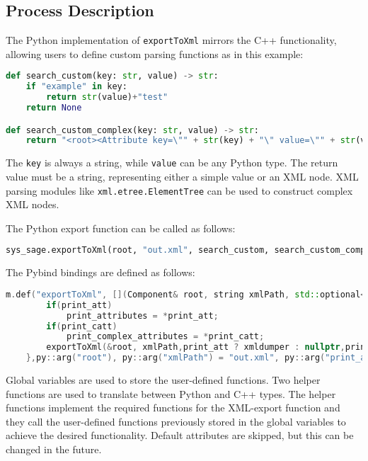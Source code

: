 \subsection{Process Description}

The Python implementation of \verb|exportToXml| mirrors the C++ functionality, allowing users to define custom parsing functions as in this example:

\begin{lstlisting}[language=Python, xleftmargin=4em, frame = single]
def search_custom(key: str, value) -> str:
    if "example" in key:
        return str(value)+"test"
    return None

def search_custom_complex(key: str, value) -> str:
    return "<root><Attribute key=\"" + str(key) + "\" value=\"" + str(value) + "\"/><root>"
\end{lstlisting}

The \verb|key| is always a string, while \verb|value| can be any Python type. The return value must be a string, representing either a simple value or an XML node. XML parsing modules like \verb|xml.etree.ElementTree| can be used to construct complex XML nodes.

The Python export function can be called as follows:

\begin{lstlisting}[language=Python, xleftmargin=4em, frame = single]
sys_sage.exportToXml(root, "out.xml", search_custom, search_custom_complex)
\end{lstlisting}

The Pybind bindings are defined as follows:

\begin{lstlisting}[language=C++, xleftmargin=4em, frame = single]
m.def("exportToXml", [](Component& root, string xmlPath, std::optional<py::function> print_att = std::nullopt, std::optional<py::function> print_catt = std::nullopt) {
        if(print_att)
            print_attributes = *print_att;
        if(print_catt)
            print_complex_attributes = *print_catt;
        exportToXml(&root, xmlPath,print_att ? xmldumper : nullptr,print_catt ? xmldumper_complex : nullptr);
    },py::arg("root"), py::arg("xmlPath") = "out.xml", py::arg("print_att") = py::none(), py::arg("print_catt") = py::none());
\end{lstlisting}

Global variables are used to store the user-defined functions. Two helper functions are used to translate between Python and C++ types. The helper functions implement the required functions for the XML-export function and they call the user-defined functions previously stored in the global variables to achieve the desired functionality. Default attributes are skipped, but this can be changed in the future.

